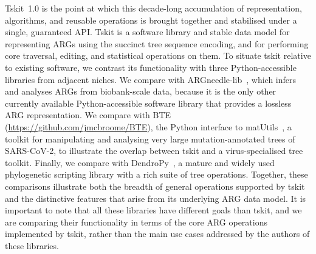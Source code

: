 \documentclass{article}
\begin{document}
Tskit~1.0 is the point at which this decade-long accumulation of
representation, algorithms, and reusable operations is brought
together and stabilised under a single, guaranteed API.
Tskit is a software library and stable data model for representing
ARGs using the succinct tree sequence encoding, and for performing
core traversal, editing, and statistical operations on them.
To situate tskit relative to existing software, we contrast its
functionality with three Python-accessible libraries from adjacent
niches.
We compare with ARGneedle-lib~\citep{zhang2023biobank}, which infers
and analyses ARGs from biobank-scale data, because it is the only
other currently available Python-accessible software library that
provides a lossless ARG representation.
We compare with BTE (\url{https://github.com/jmcbroome/BTE}), the
Python interface to matUtils~\citep{mcbroome2021daily}, a toolkit for
manipulating and analysing very large mutation-annotated trees of
SARS-CoV-2, to illustrate the overlap between tskit and a
virus-specialised tree toolkit.
Finally, we compare with DendroPy~\citep{sukumaran2010dendropy}, a
mature and widely used phylogenetic scripting library with a rich
suite of tree operations.
Together, these comparisons illustrate both the breadth of general
operations supported by tskit and the distinctive features that arise
from its underlying ARG data model.
It is important to note that all these libraries have different goals than tskit, and
we are comparing their functionality in terms of the core ARG operations implemented by tskit,
rather than the main use cases addressed by the authors of these libraries.
\end{document}
